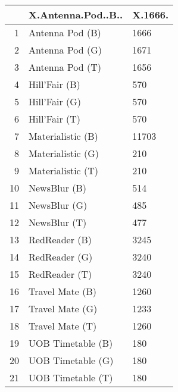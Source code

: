 \begin{table}[ht]
\centering
\begin{tabular}{rll}
  \hline
 & X.Antenna.Pod..B.. & X.1666. \\ 
  \hline
1 & Antenna Pod (B) & 1666 \\ 
  2 & Antenna Pod (G) & 1671 \\ 
  3 & Antenna Pod (T) & 1656 \\ 
  4 & Hill'Fair (B) & 570 \\ 
  5 & Hill'Fair (G) & 570 \\ 
  6 & Hill'Fair (T) & 570 \\ 
  7 & Materialistic (B) & 11703 \\ 
  8 & Materialistic (G) & 210 \\ 
  9 & Materialistic (T) & 210 \\ 
  10 & NewsBlur (B) & 514 \\ 
  11 & NewsBlur (G) & 485 \\ 
  12 & NewsBlur (T) & 477 \\ 
  13 & RedReader (B) & 3245 \\ 
  14 & RedReader (G) & 3240 \\ 
  15 & RedReader (T) & 3240 \\ 
  16 & Travel Mate (B) & 1260 \\ 
  17 & Travel Mate (G) & 1233 \\ 
  18 & Travel Mate (T) & 1260 \\ 
  19 & UOB Timetable (B) & 180 \\ 
  20 & UOB Timetable (G) & 180 \\ 
  21 & UOB Timetable (T) & 180 \\ 
   \hline
\end{tabular}
\end{table}

